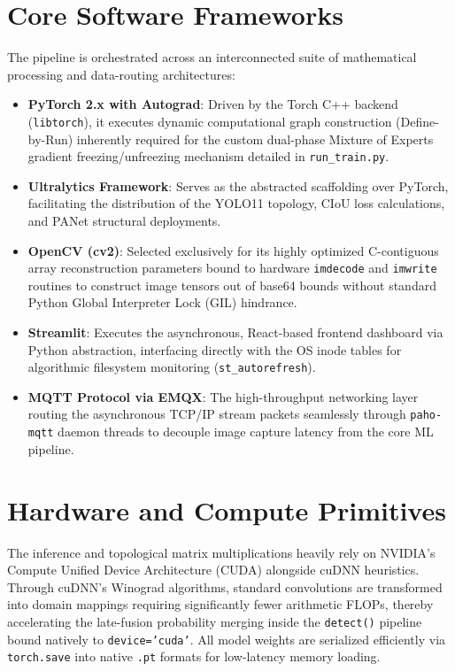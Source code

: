 \documentclass[11pt, letterpaper, oneside, openany]{book}
\begin{document}
\section{Core Software Frameworks}
The pipeline is orchestrated across an interconnected suite of mathematical processing and data-routing architectures:
\begin{itemize}
    \item \textbf{PyTorch 2.x with Autograd}: Driven by the Torch C++ backend (\texttt{libtorch}), it executes dynamic computational graph construction (Define-by-Run) inherently required for the custom dual-phase Mixture of Experts gradient freezing/unfreezing mechanism detailed in \texttt{run\_train.py}.
    \item \textbf{Ultralytics Framework}: Serves as the abstracted scaffolding over PyTorch, facilitating the distribution of the YOLO11 topology, CIoU loss calculations, and PANet structural deployments.
    \item \textbf{OpenCV (cv2)}: Selected exclusively for its highly optimized C-contiguous array reconstruction parameters bound to hardware \texttt{imdecode} and \texttt{imwrite} routines to construct image tensors out of base64 bounds without standard Python Global Interpreter Lock (GIL) hindrance.
    \item \textbf{Streamlit}: Executes the asynchronous, React-based frontend dashboard via Python abstraction, interfacing directly with the OS inode tables for algorithmic filesystem monitoring (\texttt{st\_autorefresh}).
    \item \textbf{MQTT Protocol via EMQX}: The high-throughput networking layer routing the asynchronous TCP/IP stream packets seamlessly through \texttt{paho-mqtt} daemon threads to decouple image capture latency from the core ML pipeline.
\end{itemize}

\section{Hardware and Compute Primitives}
The inference and topological matrix multiplications heavily rely on NVIDIA's Compute Unified Device Architecture (CUDA) alongside cuDNN heuristics. Through cuDNN's Winograd algorithms, standard convolutions are transformed into domain mappings requiring significantly fewer arithmetic FLOPs, thereby accelerating the late-fusion probability merging inside the \texttt{detect()} pipeline bound natively to \texttt{device='cuda'}. All model weights are serialized efficiently via \texttt{torch.save} into native \texttt{.pt} formats for low-latency memory loading.
\end{document}
